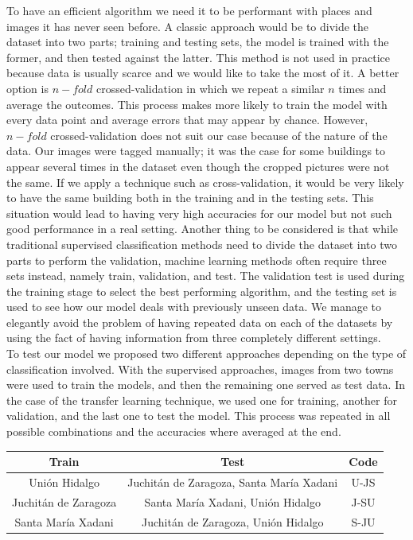 To have an efficient algorithm we need it to be performant with places and images it has never seen before. A classic approach would be to divide the dataset into two parts; training and testing sets, the model is trained with the former, and then tested against the latter. This method is not used in practice because data is usually scarce and we would like to take the most of it. A better option is $n-fold$ crossed-validation in which we repeat a similar $n$ times and average the outcomes. This process makes more likely to train the model with every data point and average errors that may appear by chance. However, $n-fold$ crossed-validation does not suit our case because of the nature of the data. Our images were tagged manually; it was the case for some buildings to appear several times in the dataset even though the cropped pictures were not the same. If we apply a technique such as cross-validation, it would be very likely to have the same building both in the training and in the testing sets. This situation would lead to having very high accuracies for our model but not such good performance in a real setting. Another thing to be considered is that while traditional supervised classification methods need to divide the dataset into two parts to perform the validation, machine learning methods often require three sets instead, namely train, validation,  and test. The validation test is used during the training stage to select the best performing algorithm, and the testing set is used to see how our model deals with previously unseen data. We manage to elegantly avoid the problem of having repeated data on each of the datasets by using the fact of having information from three completely different settings.\\

To test our model we proposed two different approaches depending on the type of classification involved. With the supervised approaches, images from two towns were used to train the models, and then the remaining one served as test data. In the case of the transfer learning technique, we used one for training, another for validation, and the last one to test the model. This process was repeated in all possible combinations and the accuracies where averaged at the end.\\



\begin{center}
  \begin{tabular}{|c|c|c|}
    \hline
    Train                  &Test                                           &Code \\ \hline
    Uni\'on Hidalgo        &Juchit\'an de Zaragoza, Santa Mar\'ia Xadani   &U-JS \\ \hline
    Juchit\'an de Zaragoza &Santa Mar\'ia Xadani, Uni\'on Hidalgo          &J-SU \\ \hline
    Santa Mar\'ia Xadani   &Juchit\'an de Zaragoza, Uni\'on Hidalgo        &S-JU \\ 
    \hline
  \end{tabular}
\end{center}



